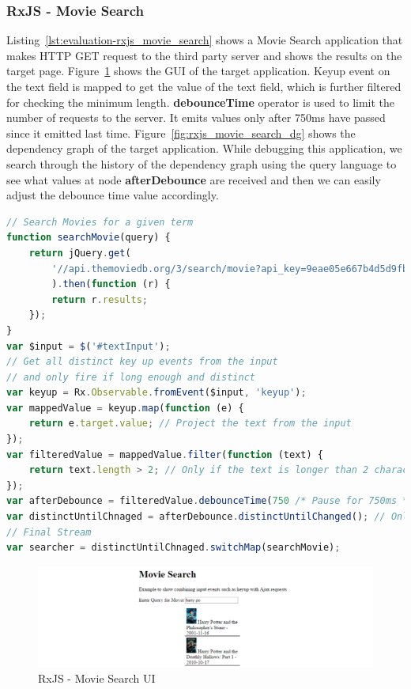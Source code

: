 \subsubsection{RxJS - Movie Search}
Listing~\ref{lst:evaluation-rxjs_movie_search} shows a Movie Search application that makes HTTP GET request to the third party server and shows the results on the target page. Figure~\ref{fig:rxjs_movie_search} shows the GUI of the target application. Keyup event on the text field is mapped to get the value of the text field, which is further filtered for checking the minimum length. \textbf{debounceTime} operator is used to limit the number of requests to the server. It emits values only after 750ms have passed since it emitted last time.
Figure~\ref{fig:rxjs_movie_search_dg} shows the dependency graph of the target application. While debugging this application, we search through the history of the dependency graph using the query language to see what values at node \textbf{afterDebounce} are received and then we can easily adjust the debounce time value accordingly. 


\begin{lstlisting}[language=JavaScript, caption=RxJS - Movie Search, label={lst:evaluation-rxjs_movie_search}]
// Search Movies for a given term
function searchMovie(query) {
	return jQuery.get(
		'//api.themoviedb.org/3/search/movie?api_key=9eae05e667b4d5d9fbb75d27622347fe&query=' + query
		).then(function (r) {
		return r.results;
	});
}
var $input = $('#textInput');
// Get all distinct key up events from the input
// and only fire if long enough and distinct
var keyup = Rx.Observable.fromEvent($input, 'keyup');
var mappedValue = keyup.map(function (e) {
	return e.target.value; // Project the text from the input
});
var filteredValue = mappedValue.filter(function (text) {
	return text.length > 2; // Only if the text is longer than 2 characters
});
var afterDebounce = filteredValue.debounceTime(750 /* Pause for 750ms */);
var distinctUntilChnaged = afterDebounce.distinctUntilChanged(); // Only if the value has changed
// Final Stream
var searcher = distinctUntilChnaged.switchMap(searchMovie);
\end{lstlisting}

\begin{figure}[!h]
	\centering
	\includegraphics[width=\textwidth,height=\textheight,keepaspectratio]{gfx/evaluation/movie_search_ui.png}
	\caption{RxJS - Movie Search UI}
	\label{fig:rxjs_movie_search}
\end{figure}

